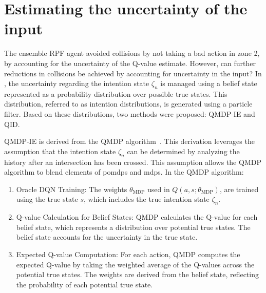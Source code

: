 \section{Estimating the uncertainty of the input}
The ensemble RPF agent avoided collisions by not taking a bad action in zone 2, by accounting for the uncertainty of the Q-value estimate. However, can further reductions in collisions be achieved by accounting for uncertainty in the input? 
In \paperBelief, the uncertainty regarding the intention state $\zeta_n$ is managed using a belief state represented as a probability distribution over possible true states. This distribution, referred to as intention distributions, is generated using a particle filter. Based on these distributions, two methods were proposed: QMDP-IE and QID.

% 			

QMDP-IE is derived from the QMDP algorithm~\cite{Littman1995}. 
This derivation leverages the assumption that the intention state $\zeta_n$ can be determined by analyzing the history after an intersection has been crossed. This assumption allows the QMDP algorithm to blend elements of \gls{pomdp}s and \gls{mdp}s.
In the QMDP algorithm:
\begin{enumerate}
	\item Oracle DQN Training: The weights $\theta_\mathrm{MDP}$ used in $Q(a,s;\theta_\mathrm{MDP})$, are trained using the true state $s$, which includes the true intention state $\zeta_n$. %
	\item Q-value Calculation for Belief States: QMDP calculates the Q-value for each belief state, which represents a distribution over potential true states. The belief state accounts for the uncertainty in the true state.
	\item Expected Q-value Computation: For each action, QMDP computes the expected Q-value by taking the weighted average of the Q-values across the potential true states. The weights are derived from the belief state, reflecting the probability of each potential true state.
\end{enumerate}

